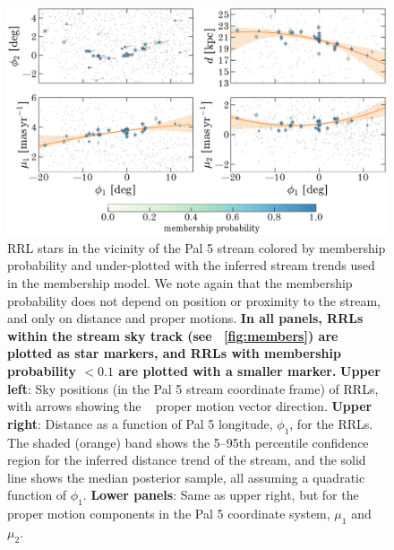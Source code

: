 \documentclass[twocolumn]{aastex63}
\newcommand{\changes}[1]{{\textbf{#1}}}
\begin{document}
\begin{figure}[t]
\begin{center}
\includegraphics[width=\textwidth]{tracks.pdf}
\caption{RRL stars in the vicinity of the Pal 5 stream colored by membership probability and under-plotted with the inferred stream trends used in the membership model.
We note again that the membership probability does not depend on position or proximity to the stream, and only on distance and proper motions.
\changes{In all panels, RRLs within the stream sky track (see \figurename~\ref{fig:members}) are plotted as star markers, and RRLs with membership probability $<0.1$ are plotted with a smaller marker.}
\textbf{Upper left}: Sky positions (in the Pal 5 stream coordinate frame) of RRLs, with arrows showing the \Gaia\  proper motion vector direction.
\textbf{Upper right}: Distance as a function of Pal 5 longitude, $\phi_1$, for the RRLs. The shaded (orange) band shows the 5--95th percentile confidence region for the inferred distance trend of the stream, and the solid line shows the median posterior sample, all assuming a quadratic function of $\phi_1$.
\textbf{Lower panels}: Same as upper right, but for the proper motion components in the Pal 5 coordinate system, $\mu_1$ and $\mu_2$.
}
\label{fig:trackmembers}
\end{center}
\end{figure}
\end{document}
